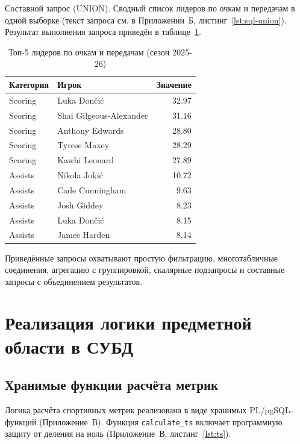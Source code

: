 Составной запрос (UNION). Сводный список лидеров по очкам
и передачам в одной выборке (текст запроса см. в Приложении~Б,
листинг~\ref{lst:sql-union}).
Результат выполнения запроса приведён в таблице~\ref{tab:sql-union-result}.

{\footnotesize\setlength{\tabcolsep}{4pt}\renewcommand{\arraystretch}{1.15}
\begin{table}[H]
\caption{Топ-5 лидеров по очкам и передачам (сезон 2025-26)}
\label{tab:sql-union-result}
\centering
\begin{tabular}{|l|l|r|}
\hline
\textbf{Категория} & \textbf{Игрок} & \textbf{Значение} \\
\hline
Scoring & Luka Dončić               & 32.97 \\
Scoring & Shai Gilgeous-Alexander   & 31.16 \\
Scoring & Anthony Edwards           & 28.80 \\
Scoring & Tyrese Maxey              & 28.29 \\
Scoring & Kawhi Leonard             & 27.89 \\
Assists & Nikola Jokić              & 10.72 \\
Assists & Cade Cunningham           &  9.63 \\
Assists & Josh Giddey               &  8.23 \\
Assists & Luka Dončić               &  8.15 \\
Assists & James Harden              &  8.14 \\
\hline
\end{tabular}
\end{table}}

Приведённые запросы охватывают простую фильтрацию, многотабличные
соединения, агрегацию с группировкой, скалярные подзапросы и составные
запросы с объединением результатов.

\section{Реализация логики предметной области в СУБД}

\subsection{Хранимые функции расчёта метрик}

Логика расчёта спортивных метрик реализована в виде хранимых
PL/pgSQL-функций (Приложение~В). Функция \texttt{calculate\_ts}
включает программную защиту от деления на ноль (Приложение~В,
листинг~\ref{lst:ts}).

